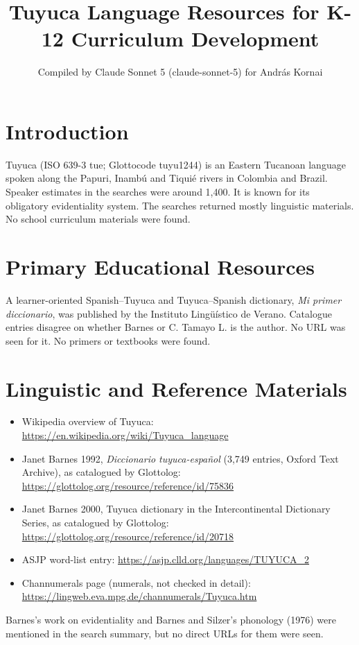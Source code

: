 \documentclass[12pt]{article}
\title{Tuyuca Language Resources for K-12 Curriculum Development}
\author{Compiled by Claude Sonnet 5 (claude-sonnet-5) for Andr\'as Kornai}
\date{}
\begin{document}
\maketitle

\section{Introduction}
Tuyuca (ISO 639-3 tue; Glottocode tuyu1244) is an Eastern Tucanoan language spoken along the Papuri, Inambú and Tiquié rivers in Colombia and Brazil. Speaker estimates in the searches were around 1,400. It is known for its obligatory evidentiality system. The searches returned mostly linguistic materials. No school curriculum materials were found.

\section{Primary Educational Resources}
A learner-oriented Spanish--Tuyuca and Tuyuca--Spanish dictionary, \textit{Mi primer diccionario}, was published by the Instituto Lingüístico de Verano. Catalogue entries disagree on whether Barnes or C. Tamayo L. is the author. No URL was seen for it. No primers or textbooks were found.

\section{Linguistic and Reference Materials}
\begin{itemize}
\item Wikipedia overview of Tuyuca: \url{https://en.wikipedia.org/wiki/Tuyuca_language}
\item Janet Barnes 1992, \textit{Diccionario tuyuca-español} (3,749 entries, Oxford Text Archive), as catalogued by Glottolog: \url{https://glottolog.org/resource/reference/id/75836}
\item Janet Barnes 2000, Tuyuca dictionary in the Intercontinental Dictionary Series, as catalogued by Glottolog: \url{https://glottolog.org/resource/reference/id/20718}
\item ASJP word-list entry: \url{https://asjp.clld.org/languages/TUYUCA_2}
\item Channumerals page (numerals, not checked in detail): \url{https://lingweb.eva.mpg.de/channumerals/Tuyuca.htm}
\end{itemize}
Barnes's work on evidentiality and Barnes and Silzer's phonology (1976) were mentioned in the search summary, but no direct URLs for them were seen.
\end{document}
